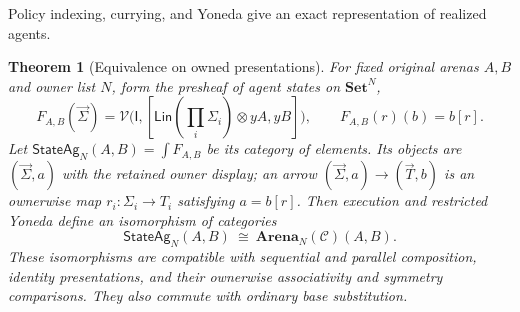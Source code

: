 \documentclass[11pt,a4paper]{article}
\numberwithin{equation}{section}
\newtheorem{theorem}{Theorem}[section]
\theoremstyle{definition}
\theoremstyle{remark}
\theoremstyle{plain}
\providecommand{\sig}{\vec{\Sigma}}
\providecommand{\taus}{\vec{T}}
\providecommand{\Lin}{\mathsf{Lin}}
\providecommand{\I}{\mathsf{I}}
\providecommand{\cC}{\mathcal{C}}
\providecommand{\cV}{\mathcal{V}}
\providecommand{\Set}{\mathbf{Set}}
\begin{document}
\noindent Policy indexing, currying, and Yoneda give an exact representation of realized agents.
\begin{center}
\end{center}

\begin{theorem}[Equivalence on owned presentations]
\label{agt-thm-owned-equivalence}
For fixed original arenas $A,B$ and owner list $N$, form the
presheaf of agent states on $\Set^N$,
\[
 F_{A,B}(\sig)=
 \cV\bigl(\I,[\Lin(\prod_i\Sigma_i)\otimes yA,yB]\bigr),
 \qquad F_{A,B}(r)(b)=b[r].
\]
Let $\mathsf{StateAg}_N(A,B)=\int F_{A,B}$ be its category of
elements. Its objects are $(\sig,a)$ with the retained owner display;
an arrow $(\sig,a)\to(\taus,b)$ is an ownerwise map
$r_i:\Sigma_i\to T_i$ satisfying $a=b[r]$.
Then execution and restricted Yoneda define an isomorphism of categories
\[
 \mathsf{StateAg}_N(A,B)\ \cong\
 \mathbf{Arena}_N(\cC)(A,B).
\]
These isomorphisms are compatible with sequential and parallel composition,
identity presentations, and their ownerwise associativity and symmetry
comparisons.  They also commute with ordinary base substitution.
\end{theorem}
\end{document}
